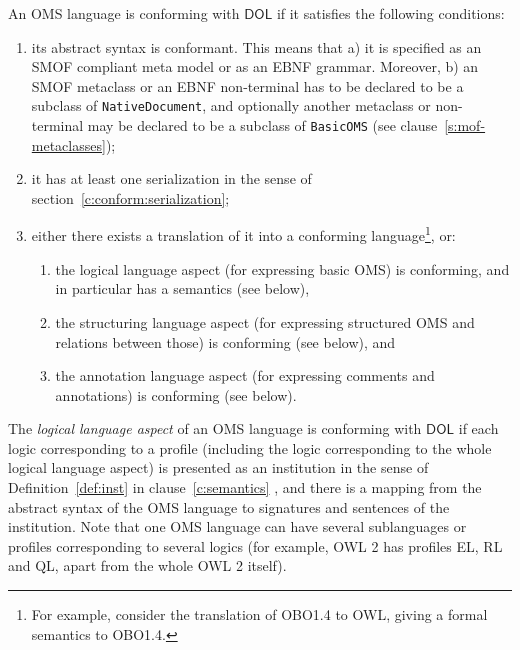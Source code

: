 \documentclass[10pt,fleqn,final]{scrreprt}
\newcommand*{\syntax}[1]{\texttt{#1}}
\newcommand*{\DOL}{\ensuremath{\mathsf{DOL}}\xspace}
\begin{document}
An OMS language is conforming with \DOL if it satisfies the following conditions:
\begin{enumerate}
\item its abstract syntax is conformant. This means that a) it is specified as an SMOF compliant meta model
or as an EBNF grammar. Moreover, b) an SMOF metaclass or an EBNF non-terminal has to be declared to be a subclass of \syntax{NativeDocument}, and optionally
another metaclass or non-terminal may be declared to be a subclass of \syntax{BasicOMS}  (see clause~\ref{s:mof-metaclasses});
\item it has at least one serialization in the sense of section~\ref{c:conform:serialization};
\item either there exists a translation of it into a conforming
  language\footnote{For  example, consider the translation of OBO1.4
    to OWL, giving a formal semantics to OBO1.4.}, or:
\begin{enumerate}
\item the logical language aspect (for expressing basic OMS) is conforming, and in particular has a semantics (see below),
\item  the structuring language aspect (for expressing structured OMS and relations
between those) is conforming (see below), and
\item the annotation language aspect (for expressing comments and annotations)
is conforming (see below).
\end{enumerate}
\end{enumerate}


The \emph{logical language aspect} of an OMS language
is %
conforming with \DOL if each logic corresponding to a profile (including
the logic corresponding to the whole logical language aspect) is presented as an
institution  in the sense of Definition~\ref{def:inst} in clause~\ref{c:semantics} , and there is a mapping from
the abstract syntax of the OMS language to signatures and sentences
of the institution.
Note that one OMS language can have several sublanguages or profiles 
corresponding to several logics (for example, OWL 2 has profiles EL, RL and QL, apart from the
whole OWL 2 itself).
\end{document}

